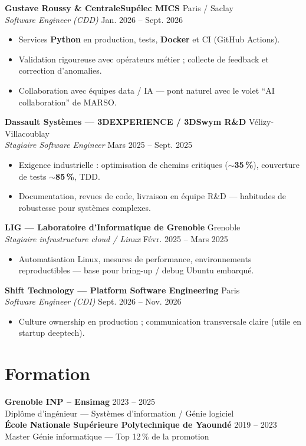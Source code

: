 \documentclass[10pt,a4paper]{article}
\begin{document}
\textbf{Gustave Roussy \& CentraleSup\'elec MICS} \hfill Paris / Saclay\\
\textit{Software Engineer (CDD)} \hfill Jan. 2026 -- Sept. 2026
\begin{itemize}
  \item Services \textbf{Python} en production, tests, \textbf{Docker} et CI (GitHub Actions).
  \item Validation rigoureuse avec op\'erateurs m\'etier ; collecte de feedback et correction d'anomalies.
  \item Collaboration avec \'equipes data / IA --- pont naturel avec le volet ``AI collaboration'' de MARSO.
\end{itemize}

\textbf{Dassault Syst\`emes --- 3DEXPERIENCE / 3DSwym R\&D} \hfill V\'elizy-Villacoublay\\
\textit{Stagiaire Software Engineer} \hfill Mars 2025 -- Sept. 2025
\begin{itemize}
  \item Exigence industrielle : optimisation de chemins critiques ($\sim$\textbf{35\,\%}), couverture de tests $\sim$\textbf{85\,\%}, TDD.
  \item Documentation, revues de code, livraison en \'equipe R\&D --- habitudes de robustesse pour syst\`emes complexes.
\end{itemize}

\textbf{LIG --- Laboratoire d'Informatique de Grenoble} \hfill Grenoble\\
\textit{Stagiaire infrastructure cloud / Linux} \hfill F\'evr. 2025 -- Mars 2025
\begin{itemize}
  \item Automatisation Linux, mesures de performance, environnements reproductibles --- base pour bring-up / debug Ubuntu embarqu\'e.
\end{itemize}

\textbf{Shift Technology --- Platform Software Engineering} \hfill Paris\\
\textit{Software Engineer (CDI)} \hfill Sept. 2026 -- Nov. 2026
\begin{itemize}
  \item Culture ownership en production ; communication transversale claire (utile en startup deeptech).
\end{itemize}

\section{Formation}
\textbf{Grenoble INP -- Ensimag} \hfill 2023 -- 2025\\
Dipl\^ome d'ing\'enieur --- Syst\`emes d'information / G\'enie logiciel\\[2pt]
\textbf{\'Ecole Nationale Sup\'erieure Polytechnique de Yaound\'e} \hfill 2019 -- 2023\\
Master G\'enie informatique --- Top 12\,\% de la promotion
\end{document}
